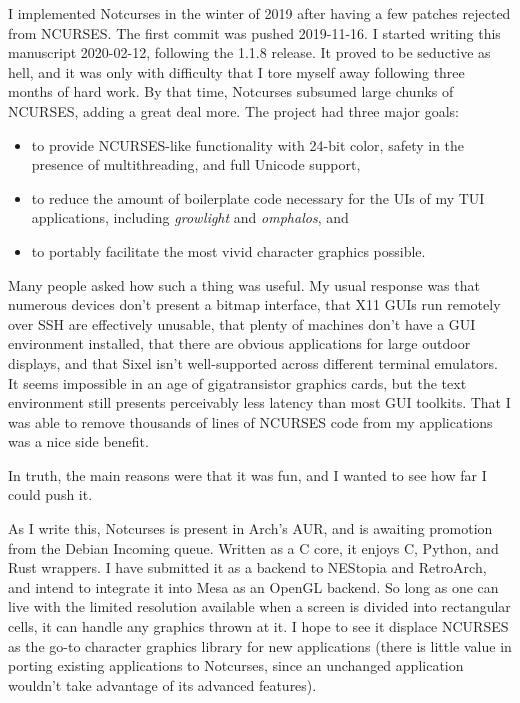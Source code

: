 \documentclass[letterpaper,10pt]{article}
\newenvironment{denseitemize}{
  \begin{itemize}
      \setlength{\itemsep}{0pt}
}{
  \end{itemize}
}
\newcommand\CC{C\nolinebreak\hspace{-.05em}\raisebox{.4ex}{\relsize{-3}{\textbf{+}}}\nolinebreak\hspace{-.10em}\raisebox{.4ex}{\relsize{-3}{\textbf{+}}}\hspace{.2em}}
\begin{document}
I implemented Notcurses in the winter of 2019 after having a few patches
rejected from NCURSES. The first commit was pushed 2019-11-16. I started
writing this manuscript 2020-02-12, following the 1.1.8 release. It proved to
be seductive as hell, and it was only with difficulty that I tore myself away
following three months of hard work. By that time, Notcurses subsumed large
chunks of NCURSES, adding a great deal more. The project had three
major goals:

\begin{denseitemize}
\item to provide NCURSES-like functionality with 24-bit color, safety in the
    presence of multithreading, and full Unicode support,
\item to reduce the amount of boilerplate code necessary for the UIs of my
    TUI applications, including \textit{growlight} and \textit{omphalos}, and
\item to portably facilitate the most vivid character graphics possible.
\end{denseitemize}

Many people asked how such a thing was useful. My usual response was that
numerous devices don't present a bitmap interface, that X11 GUIs run remotely
over SSH are effectively unusable, that plenty of machines don't have a GUI
environment installed, that there are obvious applications for large outdoor
displays, and that Sixel isn't well-supported across different
terminal emulators. It seems impossible in an age of gigatransistor graphics
cards, but the text environment still presents perceivably less latency
than most GUI toolkits. That I was able to remove thousands of lines
of NCURSES code from my applications was a nice side benefit.

In truth, the main reasons were that it was fun, and I wanted to see how far
I could push it.

As I write this, Notcurses is present in Arch's AUR, and is awaiting promotion
from the Debian Incoming queue. Written as a C core, it enjoys \CC, Python, and
Rust wrappers. I have submitted it as a backend to NEStopia and RetroArch, and
intend to integrate it into Mesa as an OpenGL backend. So long as one can live
with the limited resolution available when a screen is divided into rectangular
cells, it can handle any graphics thrown at it. I hope to see it displace
NCURSES as the go-to character graphics library for new applications (there is
little value in porting existing applications to Notcurses, since an unchanged
application wouldn't take advantage of its advanced features).
\end{document}
